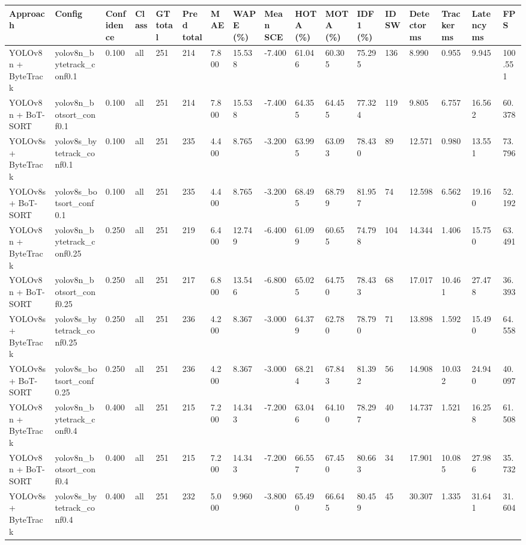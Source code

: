 \begin{tabular}{lllllllllllllllll}
\toprule
Approach & Config & Confidence & Class & GT total & Pred total & MAE & WAPE (\%) & Mean SCE & HOTA (\%) & MOTA (\%) & IDF1 (\%) & IDSW & Detector ms & Tracker ms & Latency ms & FPS \\
\midrule
YOLOv8n + ByteTrack & yolov8n\_bytetrack\_conf0.1 & 0.100 & all & 251 & 214 & 7.800 & 15.538 & -7.400 & 61.046 & 60.305 & 75.295 & 136 & 8.990 & 0.955 & 9.945 & 100.551 \\
YOLOv8n + BoT-SORT & yolov8n\_botsort\_conf0.1 & 0.100 & all & 251 & 214 & 7.800 & 15.538 & -7.400 & 64.355 & 64.455 & 77.324 & 119 & 9.805 & 6.757 & 16.562 & 60.378 \\
YOLOv8s + ByteTrack & yolov8s\_bytetrack\_conf0.1 & 0.100 & all & 251 & 235 & 4.400 & 8.765 & -3.200 & 63.995 & 63.093 & 78.430 & 89 & 12.571 & 0.980 & 13.551 & 73.796 \\
YOLOv8s + BoT-SORT & yolov8s\_botsort\_conf0.1 & 0.100 & all & 251 & 235 & 4.400 & 8.765 & -3.200 & 68.495 & 68.799 & 81.957 & 74 & 12.598 & 6.562 & 19.160 & 52.192 \\
YOLOv8n + ByteTrack & yolov8n\_bytetrack\_conf0.25 & 0.250 & all & 251 & 219 & 6.400 & 12.749 & -6.400 & 61.099 & 60.655 & 74.798 & 104 & 14.344 & 1.406 & 15.750 & 63.491 \\
YOLOv8n + BoT-SORT & yolov8n\_botsort\_conf0.25 & 0.250 & all & 251 & 217 & 6.800 & 13.546 & -6.800 & 65.025 & 64.750 & 78.433 & 68 & 17.017 & 10.461 & 27.478 & 36.393 \\
YOLOv8s + ByteTrack & yolov8s\_bytetrack\_conf0.25 & 0.250 & all & 251 & 236 & 4.200 & 8.367 & -3.000 & 64.379 & 62.780 & 78.790 & 71 & 13.898 & 1.592 & 15.490 & 64.558 \\
YOLOv8s + BoT-SORT & yolov8s\_botsort\_conf0.25 & 0.250 & all & 251 & 236 & 4.200 & 8.367 & -3.000 & 68.214 & 67.843 & 81.392 & 56 & 14.908 & 10.032 & 24.940 & 40.097 \\
YOLOv8n + ByteTrack & yolov8n\_bytetrack\_conf0.4 & 0.400 & all & 251 & 215 & 7.200 & 14.343 & -7.200 & 63.046 & 64.100 & 78.297 & 40 & 14.737 & 1.521 & 16.258 & 61.508 \\
YOLOv8n + BoT-SORT & yolov8n\_botsort\_conf0.4 & 0.400 & all & 251 & 215 & 7.200 & 14.343 & -7.200 & 66.557 & 67.450 & 80.663 & 34 & 17.901 & 10.085 & 27.986 & 35.732 \\
YOLOv8s + ByteTrack & yolov8s\_bytetrack\_conf0.4 & 0.400 & all & 251 & 232 & 5.000 & 9.960 & -3.800 & 65.490 & 66.645 & 80.459 & 45 & 30.307 & 1.335 & 31.641 & 31.604 \\

\end{tabular}

